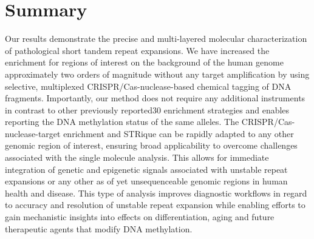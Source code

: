 \section{Summary}
\label{sec:strique:summary}

Our results demonstrate the precise and multi-layered molecular characterization of pathological short tandem repeat expansions. We have increased the enrichment for regions of interest on the background of the human genome approximately two orders of magnitude without any target amplification by using selective, multiplexed CRISPR/Cas-nuclease-based chemical tagging of DNA fragments. Importantly, our method does not require any additional instruments in contrast to other previously reported30 enrichment strategies and enables reporting the DNA methylation status of the same alleles. The CRISPR/Cas-nuclease-target enrichment and STRique can be rapidly adapted to any other genomic region of interest, ensuring broad applicability to overcome challenges associated with the single molecule analysis. This allows for immediate integration of genetic and epigenetic signals associated with unstable repeat expansions or any other as of yet unsequenceable genomic regions in human health and disease. This type of analysis improves diagnostic workflows in regard to accuracy and resolution of unstable repeat expansion while enabling efforts to gain mechanistic insights into effects on differentiation, aging and future therapeutic agents that modify DNA methylation.


